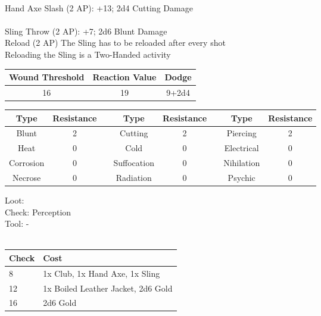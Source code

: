 \\
Hand Axe Slash (2 AP): +13; 2d4 Cutting Damage\\
\\
Sling Throw (2 AP): +7; 2d6 Blunt Damage\\
Reload (2 AP) The Sling has to be reloaded after every shot\\
Reloading the Sling is a Two-Handed activity\\
\bigbreak
\begin{minipage}[H]{1\textwidth}
	\centering
	\begin{tabular}[c]{|c | c | c|}
		\hline
		Wound Threshold & Reaction Value & Dodge\\
		\hline
		16 & 19 & 9+2d4\\
		\hline
	\end{tabular}
\end{minipage}
\bigbreak
\noindent
\begin{minipage}[H]{1\textwidth}
	\centering
	\begin{tabular}[c]{|c | c | c | c | c | c | c | c|}  
		\hline
		Type & Resistance && Type & Resistance && Type & Resistance\\
		\hline
		Blunt & 2 && 
		Cutting & 2 && 
		Piercing & 2\\
		Heat & 0 && 
		Cold & 0 && 
		Electrical & 0\\
		Corrosion & 0 && 
		Suffocation & 0 && 
		Nihilation & 0 \\
		Necrose & 0 && 
		Radiation & 0 && 
		Psychic & 0\\
		\hline
	\end{tabular}
\end{minipage}
\bigbreak
\noindent
Loot:\\
Check: Perception\\
Tool: -\\
\\
\begin{minipage}{0.8\textwidth}
	\begin{tabular}{|l | l|}
		\hline
		Check & Cost\\
		\hline
		8 & 1x Club, 1x Hand Axe, 1x Sling\\
		12 & 1x Boiled Leather Jacket, 2d6 Gold\\
		16 & 2d6 Gold\\
		\hline
	\end{tabular}
\end{minipage}
\pagebreak